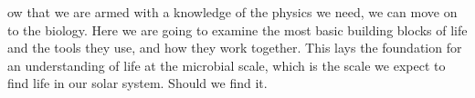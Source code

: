 ow that we are armed with a knowledge of the physics we need, we can move on to the biology. Here we are going to examine the most basic building blocks of life and the tools they use, and how they work together. This lays the foundation for an understanding of life at the microbial scale, which is the scale we expect to find life in our solar system.  Should we find it.